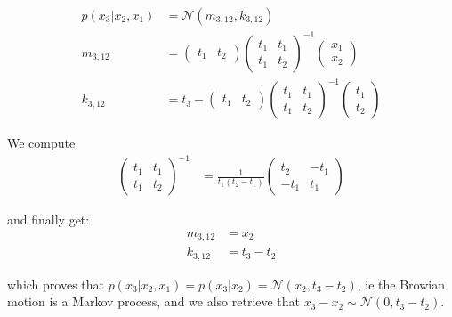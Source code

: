 \begin{align}
    p(x_3 \vert x_2, x_1) &= \mathcal{N}(m_{3,12}, k_{3,12}) \\
    m_{3,12} &= \begin{pmatrix}
        t_1 & t_2
    \end{pmatrix}
    \begin{pmatrix}
        t_1 & t_1 \\
        t_1 & t_2
    \end{pmatrix}^{-1}
    \begin{pmatrix}
        x_1 \\ x_2
    \end{pmatrix} \\
    k_{3,12} &= t_3 - \begin{pmatrix}
        t_1 & t_2
    \end{pmatrix}
    \begin{pmatrix}
        t_1 & t_1 \\
        t_1 & t_2
    \end{pmatrix}^{-1}
    \begin{pmatrix}
        t_1 \\ t_2
    \end{pmatrix}
\end{align}

We compute
\begin{align}
    \begin{pmatrix}
        t_1 & t_1 \\
        t_1 & t_2
    \end{pmatrix}^{-1} &= \frac{1}{t_1(t_2 - t_1)}
    \begin{pmatrix}
        t_2 & -t_1 \\
        -t_1 & t_1
    \end{pmatrix}
\end{align}

and finally get:
\begin{align}
    m_{3,12} &= x_2 \\
    k_{3,12} &= t_3 - t_2
\end{align}

which proves that $p(x_3 \vert x_2, x_1) = p(x_3 \vert x_2) = \mathcal{N}(x_2, t_3-t_2)$, ie the Browian motion is a Markov process,
and we also retrieve that $x_3 - x_2 \sim \mathcal{N}(0, t_3-t_2)$.

